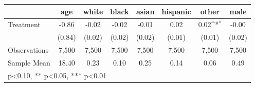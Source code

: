 {
\def\sym#1{\ifmmode^{#1}\else\(^{#1}\)\fi}
\begin{tabular}{l*{7}{c}}
\toprule
                    &\multicolumn{1}{c}{age}&\multicolumn{1}{c}{white}&\multicolumn{1}{c}{black}&\multicolumn{1}{c}{asian}&\multicolumn{1}{c}{hispanic}&\multicolumn{1}{c}{other}&\multicolumn{1}{c}{male}\\
\midrule
Treatment           &       -0.86         &       -0.02         &       -0.02         &       -0.01         &        0.02         &        0.02\sym{*}  &       -0.00         \\
                    &      (0.84)         &      (0.02)         &      (0.02)         &      (0.02)         &      (0.01)         &      (0.01)         &      (0.02)         \\
\midrule
Observations        &       7,500         &       7,500         &       7,500         &       7,500         &       7,500         &       7,500         &       7,500         \\
Sample Mean         &       18.40         &        0.23         &        0.10         &        0.25         &        0.14         &        0.06         &        0.49         \\
\bottomrule
\multicolumn{8}{l}{\footnotesize * p<0.10, ** p<0.05, *** p<0.01}\\
\end{tabular}
}
